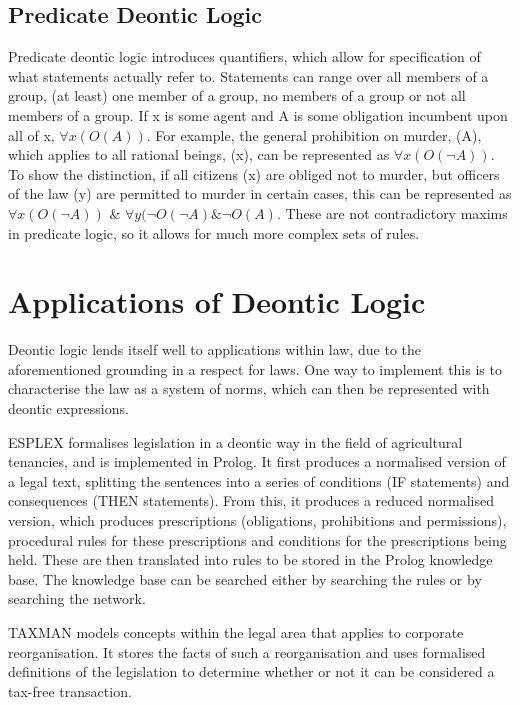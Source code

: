 \documentclass{l4proj}
\begin{document}
\subsection{Predicate Deontic Logic}
Predicate deontic logic\cite{predicate} introduces quantifiers, which allow for specification of what statements actually refer to. Statements can range over all members of a group, (at least) one member of a group, no members of a group or not all members of a group. If x is some agent and A is some obligation incumbent upon all of x, \( \forall{x(O(A))} \). For example, the general prohibition on murder, (A), which applies to all rational beings, (x), can be represented as \( \forall{x(O( \neg A))} \). To show the distinction, if all citizens (x) are obliged not to murder, but officers of the law (y) are permitted to murder in certain cases, this can be represented as \( \forall{x(O( \neg A))} \) \& \( \forall{y( \neg O( \neg A) \& \neg O(A)} \). These are not contradictory maxims in predicate logic, so it allows for much more complex sets of rules. 

\section{Applications of Deontic Logic}
Deontic logic lends itself well to applications within law, due to the aforementioned grounding in a respect for laws. One way to implement this is to characterise the law as a system of norms\cite{law-jonessergot}, which can then be represented with deontic expressions. 

ESPLEX formalises legislation in a deontic way in the field of agricultural tenancies\cite{ESPLEX}, and is implemented in Prolog. It first produces a normalised version of a legal text, splitting the sentences into a series of conditions (IF statements) and consequences (THEN statements). From this, it produces a reduced normalised version, which produces prescriptions (obligations, prohibitions and permissions), procedural rules for these prescriptions and conditions for the prescriptions being held. These are then translated into rules to be stored in the Prolog knowledge base. The knowledge base can be searched either by searching the rules or by searching the network.

TAXMAN models concepts within the legal area that applies to corporate reorganisation\cite{TAXMAN}. It stores the facts of such a reorganisation and uses formalised definitions of the legislation to determine whether or not it can be considered a tax-free transaction. 
\end{document}
